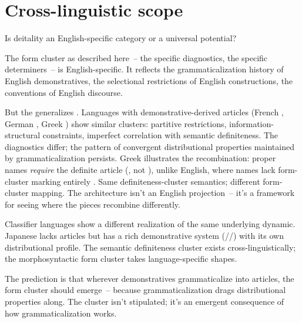 \section{Cross-linguistic scope}
\label{sec:10:cross-linguistic}

Is deitality an English-specific category or a universal potential?

The form cluster as described here~-- the specific diagnostics, the specific determiners~-- is English-specific. It reflects the grammaticalization history of English demonstratives, the selectional restrictions of English constructions, the conventions of English discourse.

But the  generalizes \citep{lyons1999}. Languages with demonstrative-derived articles (French , German , Greek ) show similar clusters: partitive restrictions, information-structural constraints, imperfect correlation with semantic definiteness. The diagnostics differ; the pattern of convergent distributional properties maintained by grammaticalization persists. Greek illustrates the recombination: proper names \emph{require} the definite article (, not ), unlike English, where names lack form-cluster marking entirely \citep{lyons1999}. Same definiteness-cluster semantics; different form-cluster mapping. The architecture isn't an English projection~-- it's a framework for seeing where the pieces recombine differently.

Classifier languages show a different realization of the same underlying dynamic. Japanese lacks articles but has a rich demonstrative system (//) with its own distributional profile. The semantic definiteness cluster exists cross-linguistically; the morphosyntactic form cluster takes language-specific shapes.

The prediction is that wherever demonstratives grammaticalize into articles, the form cluster should emerge~-- because grammaticalization drags distributional properties along. The cluster isn't stipulated; it's an emergent consequence of how grammaticalization works.

